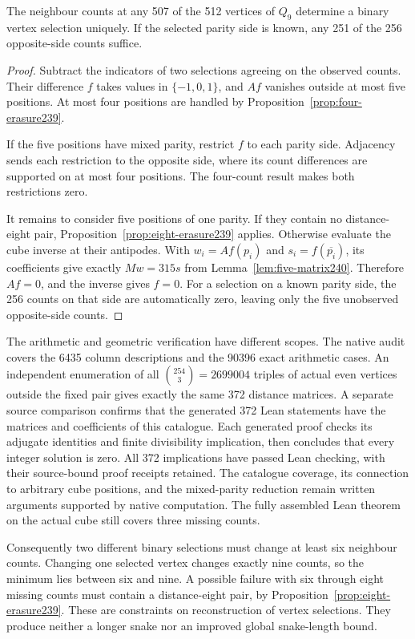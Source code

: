 \begin{proposition}\label{prop:five-erasure240}
The neighbour counts at any 507 of the 512 vertices of $Q_9$ determine
a binary vertex selection uniquely. If the selected parity side is
known, any 251 of the 256 opposite-side counts suffice.
\end{proposition}
\begin{proof}
Subtract the indicators of two selections agreeing on the observed
counts. Their difference $f$ takes values in $\{-1,0,1\}$, and $Af$
vanishes outside at most five positions. At most four positions are
handled by Proposition~\ref{prop:four-erasure239}.

If the five positions have mixed parity, restrict $f$ to each parity
side. Adjacency sends each restriction to the opposite side, where
its count differences are supported on at most four positions.
The four-count result makes both restrictions zero.

It remains to consider five positions of one parity. If they contain
no distance-eight pair, Proposition~\ref{prop:eight-erasure239} applies.
Otherwise evaluate the cube inverse at their antipodes. With
$w_i=Af(p_i)$ and $s_i=f(\overline{p_i})$, its coefficients give exactly
$Mw=315s$ from Lemma~\ref{lem:five-matrix240}. Therefore $Af=0$, and the
inverse gives $f=0$. For a selection on a known parity side, the 256
counts on that side are automatically zero, leaving only the five
unobserved opposite-side counts.
\end{proof}

The arithmetic and geometric verification have different scopes.
The native audit covers the 6435 column descriptions and the 90396
exact arithmetic cases. An independent enumeration of all
$\binom{254}{3}=2699004$ triples of actual even vertices outside the
fixed pair gives exactly the same 372 distance matrices. A separate source comparison confirms that
the generated 372 Lean statements have the matrices and coefficients
of this catalogue. Each generated proof checks its adjugate identities
and finite divisibility implication, then concludes that every integer
solution is zero. All 372 implications have passed Lean checking, with their
source-bound proof receipts retained. The catalogue coverage, its connection to arbitrary cube
positions, and the mixed-parity reduction remain written arguments
supported by native computation. The fully assembled Lean theorem on
the actual cube still covers three missing counts.

Consequently two different binary selections must change at least six
neighbour counts. Changing one selected vertex changes exactly nine
counts, so the minimum lies between six and nine. A possible failure
with six through eight missing counts must contain a distance-eight
pair, by Proposition~\ref{prop:eight-erasure239}. These are constraints
on reconstruction of vertex selections. They produce neither a longer
snake nor an improved global snake-length bound.
